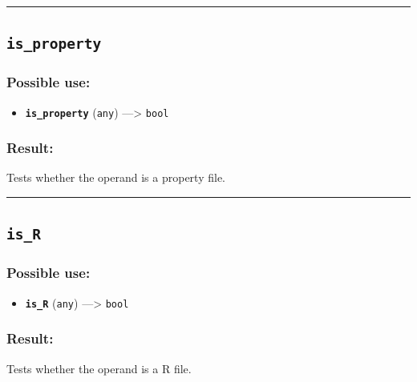 \documentclass[]{book}
\providecommand{\tightlist}{%
  \setlength{\itemsep}{0pt}\setlength{\parskip}{0pt}}
\theoremstyle{definition}
\theoremstyle{definition}
\theoremstyle{definition}
\theoremstyle{remark}
\begin{document}
\begin{center}\rule{0.5\linewidth}{\linethickness}\end{center}

\subsection{\texorpdfstring{\texttt{is\_property}}{is\_property}}\label{is_property}

\subsubsection{Possible use:}\label{possible-use-300}

\begin{itemize}
\tightlist
\item
  \textbf{\texttt{is\_property}} (\texttt{any}) ---\textgreater{}
  \texttt{bool}
\end{itemize}

\subsubsection{Result:}\label{result-290}

Tests whether the operand is a property file.

\begin{center}\rule{0.5\linewidth}{\linethickness}\end{center}

\subsection{\texorpdfstring{\texttt{is\_R}}{is\_R}}\label{is_r}

\subsubsection{Possible use:}\label{possible-use-301}

\begin{itemize}
\tightlist
\item
  \textbf{\texttt{is\_R}} (\texttt{any}) ---\textgreater{} \texttt{bool}
\end{itemize}

\subsubsection{Result:}\label{result-291}

Tests whether the operand is a R file.
\end{document}
